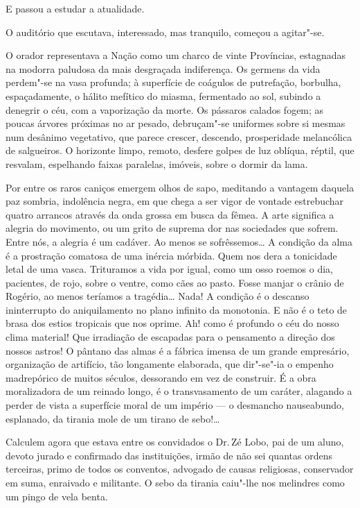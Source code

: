 E passou a estudar a atualidade. 

O auditório que
escutava, interessado, mas tranquilo, começou a agitar"-se. 

O orador
representava a Nação como um charco de vinte Províncias, estagnadas na
modorra paludosa da mais desgraçada indiferença. Os germens da vida
perdem"-se na vasa profunda; à superfície de coágulos de putrefação,
borbulha, espaçadamente, o hálito mefítico do miasma, fermentado ao
sol, subindo a denegrir o céu, com a vaporização da morte. Os pássaros
calados fogem; as poucas árvores próximas no ar pesado, debruçam"-se
uniformes sobre si mesmas num desânimo vegetativo, que parece crescer,
descendo, prosperidade melancólica de salgueiros. O horizonte limpo,
remoto, desfere golpes de luz oblíqua, réptil, que resvalam, espelhando
faixas paralelas, imóveis, sobre o dormir da lama. 

Por entre os raros
caniços emergem olhos de sapo, meditando a vantagem daquela paz
sombria, indolência negra, em que chega a ser vigor de vontade estrebuchar 
quatro arrancos através da onda grossa em busca da fêmea. A arte significa a
alegria do movimento, ou um grito de suprema dor nas sociedades que
sofrem. Entre nós, a alegria é um cadáver. Ao menos se sofrêssemos\ldots{} A
condição da alma é a prostração comatosa de uma inércia mórbida. Quem
nos dera a tonicidade letal de uma vasca. Trituramos a vida por igual, 
como um osso roemos o dia, pacientes, de rojo, sobre o ventre, como
cães ao pasto. Fosse manjar o crânio de Rogério, ao menos teríamos a
tragédia\ldots{} Nada! A condição é o descanso ininterrupto do aniquilamento
no plano infinito da monotonia. E não é o teto de brasa dos estios
tropicais que nos oprime. Ah! como é profundo o céu do nosso clima
material! Que irradiação de escapadas para o pensamento a direção dos
nossos astros! O pântano das almas é a fábrica imensa de um grande
empresário, organização de artifício, tão longamente elaborada, que
dir"-se"-ia o empenho madrepórico de muitos séculos, dessorando em vez
de construir. É a obra moralizadora de um reinado longo, é o
transvasamento de um caráter, alagando a perder de vista a superfície
moral de um império --- o desmancho nauseabundo, esplanado, da tirania
mole de um tirano de sebo!\ldots{} 

Calculem agora que estava entre os
convidados o Dr.\,Zé Lobo, pai de um aluno, devoto jurado e confirmado
das instituições, irmão de não sei quantas ordens terceiras, primo de
todos os conventos, advogado de causas religiosas, conservador em suma,
enraivado e militante. O sebo da tirania caiu"-lhe nos melindres como um
pingo de vela benta. 

